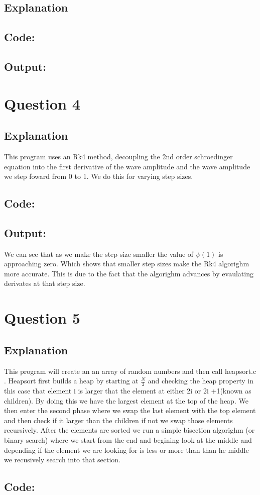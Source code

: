\documentclass[10pt]{article}
\begin{document}
\subsection{Explanation}
\subsection{Code:}

\subsection{Output:}

\section{Question 4}
\subsection{Explanation}
This program uses an Rk4 method, decoupling the 2nd order schroedinger equation into the first derivative of the wave amplitude and the wave amplitude we step foward from 0 to 1. We do this for varying step sizes.\subsection{Code:}

\subsection{Output:}

We can see that as we make the step size smaller the value of  $\psi(1)$ is approaching zero. Which shows that smaller step sizes make the Rk4 algorighm more accurate. This is due to the fact that the algorighm advances by evaulating derivates at that step size. \section{Question 5}
\subsection{Explanation}
This program will create an an array of random numbers and then call heapsort.c . Heapsort first builds a heap by starting at $\frac{N}{2}$ and checking the heap property in this case that element i is larger that the element at either 2i or 2i +1(known as children). By doing this we have the largest element at the top of the heap. We then enter the second phase where we swap the last element with the top element and then check if it larger than the children if not we swap those elements recursively. After the elements are sorted we run a simple bisection algorighm (or binary search) where we start from the end and begining look at the middle and depending if the element we are looking for is less or more than than he middle we recusively search into that section.\subsection{Code:}

\end{document}
